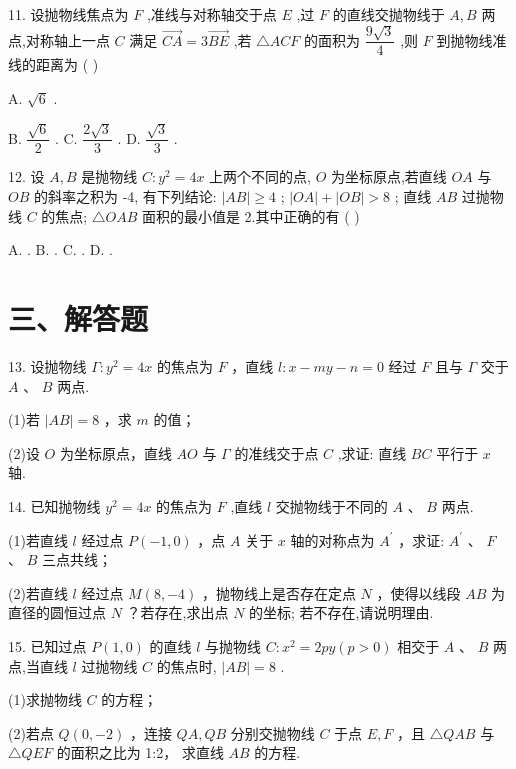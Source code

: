 11. 设抛物线焦点为 $F$ ,准线与对称轴交于点 $E$ ,过 $F$ 的直线交抛物线于 $A,B$ 两点,对称轴上一点 $C$ 满足 $\overrightarrow{CA} = 3\overrightarrow{BE}$ ,若 $\bigtriangleup {ACF}$ 的面积为 $\dfrac{9\sqrt{3}}{4}$ ,则 $F$ 到抛物线准线的距离为 ( )

A. $\sqrt{6}$ .

B. $\dfrac{\sqrt{6}}{2}$ . C. $\dfrac{2\sqrt{3}}{3}$ . D. $\dfrac{\sqrt{3}}{3}$ .

12. 设 $A,B$ 是抛物线 $C : {y}^{2} = {4x}$ 上两个不同的点, $O$ 为坐标原点,若直线 ${OA}$ 与 ${OB}$ 的斜率之积为 -4, 有下列结论:    $\left| {AB}\right|  \geq  4$ ;    $\left| {OA}\right|  + \left| {OB}\right|  > 8$ ;    直线 ${AB}$ 过抛物线 $C$ 的焦点;    $\bigtriangleup {OAB}$ 面积的最小值是 2.其中正确的有 ( )

A.       . B.       . C.       . D.         .

\section*{三、解答题}

13. 设抛物线 $\Gamma  : {y}^{2} = {4x}$ 的焦点为 $F$ ，直线 $l : x - {my} - n = 0$ 经过 $F$ 且与 $\Gamma$ 交于 $A$ 、 $B$ 两点.

(1)若 $\left| {AB}\right|  = 8$ ，求 $m$ 的值；

(2)设 $O$ 为坐标原点，直线 ${AO}$ 与 $\Gamma$ 的准线交于点 $C$ ,求证: 直线 ${BC}$ 平行于 $x$ 轴.

14. 已知抛物线 ${y}^{2} = {4x}$ 的焦点为 $F$ ,直线 $l$ 交抛物线于不同的 $A$ 、 $B$ 两点.

(1)若直线 $l$ 经过点 $P\left( {-1,0}\right)$ ，点 $A$ 关于 $x$ 轴的对称点为 ${A}^{\prime }$ ，求证: ${A}^{\prime }$ 、 $F$ 、 $B$ 三点共线；

(2)若直线 $l$ 经过点 $M\left( {8, - 4}\right)$ ，抛物线上是否存在定点 $N$ ，使得以线段 ${AB}$ 为直径的圆恒过点 $N$ ？若存在,求出点 $N$ 的坐标; 若不存在,请说明理由.

15. 已知过点 $P\left( {1,0}\right)$ 的直线 $l$ 与抛物线 $C : {x}^{2} = {2py}\left( {p > 0}\right)$ 相交于 $A$ 、 $B$ 两点,当直线 $l$ 过抛物线 $C$ 的焦点时, $\left| {AB}\right|  = 8$ .

(1)求抛物线 $C$ 的方程；

(2)若点 $Q\left( {0, - 2}\right)$ ，连接 ${QA},{QB}$ 分别交抛物线 $C$ 于点 $E,F$ ，且 $\bigtriangleup  {QAB}$ 与 $\bigtriangleup  {QEF}$ 的面积之比为 1:2， 求直线 ${AB}$ 的方程.

